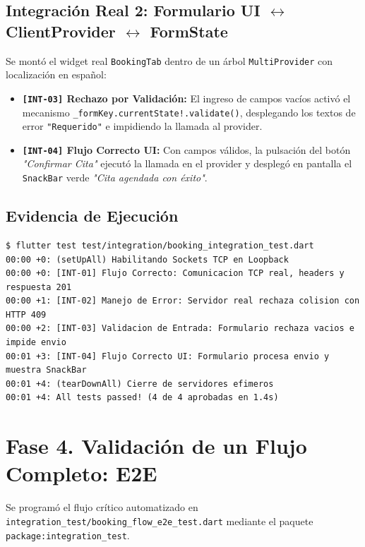 \documentclass[11pt,a4paper]{article}
\begin{document}
\subsection{Integración Real 2: Formulario UI $\longleftrightarrow$ ClientProvider $\longleftrightarrow$ FormState}
Se montó el widget real \texttt{BookingTab} dentro de un árbol \texttt{MultiProvider} con localización en español:
\begin{itemize}
    \item \textbf{\texttt{[INT-03]} Rechazo por Validación:} El ingreso de campos vacíos activó el mecanismo \texttt{\_formKey.currentState!.validate()}, desplegando los textos de error \texttt{"Requerido"} e impidiendo la llamada al provider.
    \item \textbf{\texttt{[INT-04]} Flujo Correcto UI:} Con campos válidos, la pulsación del botón \textit{"Confirmar Cita"} ejecutó la llamada en el provider y desplegó en pantalla el \texttt{SnackBar} verde \textit{"Cita agendada con éxito"}.
\end{itemize}

\subsection{Evidencia de Ejecución}

\begin{verbatim}
$ flutter test test/integration/booking_integration_test.dart
00:00 +0: (setUpAll) Habilitando Sockets TCP en Loopback
00:00 +0: [INT-01] Flujo Correcto: Comunicacion TCP real, headers y respuesta 201
00:00 +1: [INT-02] Manejo de Error: Servidor real rechaza colision con HTTP 409
00:00 +2: [INT-03] Validacion de Entrada: Formulario rechaza vacios e impide envio
00:01 +3: [INT-04] Flujo Correcto UI: Formulario procesa envio y muestra SnackBar
00:01 +4: (tearDownAll) Cierre de servidores efimeros
00:01 +4: All tests passed! (4 de 4 aprobadas en 1.4s)
\end{verbatim}

\section{Fase 4. Validación de un Flujo Completo: E2E}

Se programó el flujo crítico automatizado en \texttt{integration\_test/booking\_flow\_e2e\_test.dart} mediante el paquete \texttt{package:integration\_test}.
\end{document}
